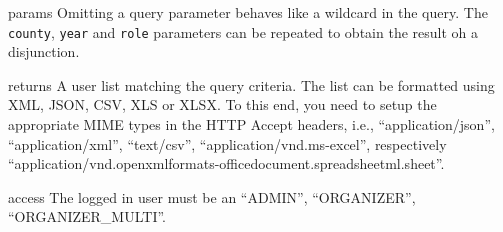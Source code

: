 \begin{apidata}{params}
  Omitting a query parameter behaves like a wildcard in the query. The
  \texttt{county}, \texttt{year} and \texttt{role} parameters can be repeated to
  obtain the result oh a disjunction.
\end{apidata}
\begin{apidata}{returns}
  A user list matching the query criteria. The list can be formatted using XML,
  JSON, CSV, XLS or XLSX. To this end, you need to setup the appropriate MIME
  types in the HTTP Accept headers, i.e., ``application/json'',
  ``application/xml'', ``text/csv'', ``application/vnd.ms-excel'', respectively
  ``application/vnd.openxmlformats-officedocument.spreadsheetml.sheet''.
\end{apidata}
\begin{apidata}{access}
The logged in user must be an ``ADMIN'', ``ORGANIZER'', ``ORGANIZER\_MULTI''. 
\end{apidata}


